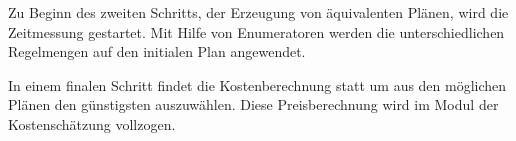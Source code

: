 Zu Beginn des zweiten Schritts, der Erzeugung von äquivalenten Plänen, wird die Zeitmessung gestartet.  Mit Hilfe von Enumeratoren werden die unterschiedlichen Regelmengen auf den initialen Plan angewendet.

In einem finalen Schritt findet die Kostenberechnung statt um aus den möglichen Plänen den günstigsten auszuwählen. Diese Preisberechnung wird im Modul der Kostenschätzung vollzogen.


